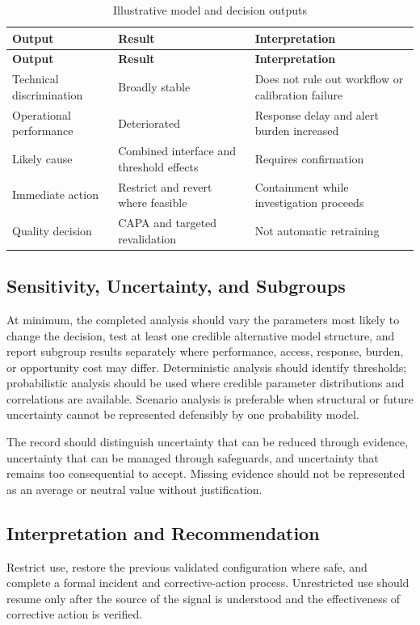 \begin{longtable}{@{}p{}p{}p{}@{}}
\caption{Illustrative model and decision outputs}
\label{tab:comp-ch05-outputs}\\
\toprule
\textbf{Output} & \textbf{Result} & \textbf{Interpretation} \\
\midrule
\endfirsthead
\toprule
\textbf{Output} & \textbf{Result} & \textbf{Interpretation} \\
\midrule
\endhead
\bottomrule
\endlastfoot
Technical discrimination & Broadly stable & Does not rule out workflow or calibration failure \\
Operational performance & Deteriorated & Response delay and alert burden increased \\
Likely cause & Combined interface and threshold effects & Requires confirmation \\
Immediate action & Restrict and revert where feasible & Containment while investigation proceeds \\
Quality decision & CAPA and targeted revalidation & Not automatic retraining \\
\end{longtable}

\subsection{Sensitivity, Uncertainty, and Subgroups}
At minimum, the completed analysis should vary the parameters most likely to
change the decision, test at least one credible alternative model structure, and
report subgroup results separately where performance, access, response, burden,
or opportunity cost may differ. Deterministic analysis should identify thresholds;
probabilistic analysis should be used where credible parameter distributions and
correlations are available. Scenario analysis is preferable when structural or
future uncertainty cannot be represented defensibly by one probability model.

The record should distinguish uncertainty that can be reduced through evidence,
uncertainty that can be managed through safeguards, and uncertainty that remains
too consequential to accept. Missing evidence should not be represented as an
average or neutral value without justification.

\subsection{Interpretation and Recommendation}
Restrict use, restore the previous validated configuration where safe, and complete a formal incident and corrective-action process. Unrestricted use should resume only after the source of the signal is understood and the effectiveness of corrective action is verified.

